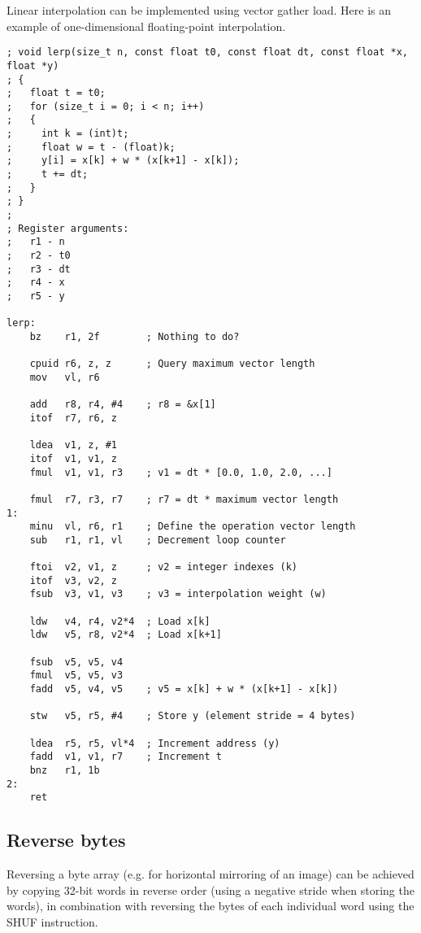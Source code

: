 Linear interpolation can be implemented using vector gather load. Here is an
example of one-dimensional floating-point interpolation.

\begin{lstlisting}[style=assembler]
; void lerp(size_t n, const float t0, const float dt, const float *x, float *y)
; {
;   float t = t0;
;   for (size_t i = 0; i < n; i++)
;   {
;     int k = (int)t;
;     float w = t - (float)k;
;     y[i] = x[k] + w * (x[k+1] - x[k]);
;     t += dt;
;   }
; }
;
; Register arguments:
;   r1 - n
;   r2 - t0
;   r3 - dt
;   r4 - x
;   r5 - y

lerp:
    bz    r1, 2f        ; Nothing to do?

    cpuid r6, z, z      ; Query maximum vector length
    mov   vl, r6

    add   r8, r4, #4    ; r8 = &x[1]
    itof  r7, r6, z

    ldea  v1, z, #1
    itof  v1, v1, z
    fmul  v1, v1, r3    ; v1 = dt * [0.0, 1.0, 2.0, ...]

    fmul  r7, r3, r7    ; r7 = dt * maximum vector length
1:
    minu  vl, r6, r1    ; Define the operation vector length
    sub   r1, r1, vl    ; Decrement loop counter

    ftoi  v2, v1, z     ; v2 = integer indexes (k)
    itof  v3, v2, z
    fsub  v3, v1, v3    ; v3 = interpolation weight (w)

    ldw   v4, r4, v2*4  ; Load x[k]
    ldw   v5, r8, v2*4  ; Load x[k+1]

    fsub  v5, v5, v4
    fmul  v5, v5, v3
    fadd  v5, v4, v5    ; v5 = x[k] + w * (x[k+1] - x[k])

    stw   v5, r5, #4    ; Store y (element stride = 4 bytes)

    ldea  r5, r5, vl*4  ; Increment address (y)
    fadd  v1, v1, r7    ; Increment t
    bnz   r1, 1b
2:
    ret
\end{lstlisting}

\subsection{Reverse bytes}

Reversing a byte array (e.g. for horizontal mirroring of an image) can be
achieved by copying 32-bit words in reverse order (using a negative stride when
storing the words), in combination with reversing the bytes of each individual
word using the SHUF instruction.

